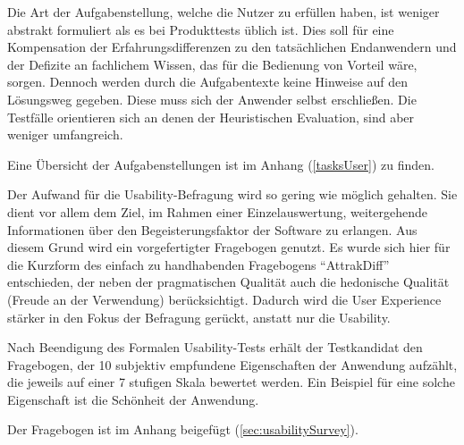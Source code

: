 Die Art der Aufgabenstellung, welche die Nutzer zu erfüllen haben, ist weniger abstrakt formuliert als es bei Produkttests üblich ist. Dies soll für eine Kompensation der Erfahrungsdifferenzen zu den tatsächlichen Endanwendern und der Defizite an fachlichem Wissen, das für die Bedienung von Vorteil wäre, sorgen. Dennoch werden durch die Aufgabentexte keine Hinweise auf den Lösungsweg gegeben. Diese muss sich der Anwender selbst erschließen. Die Testfälle orientieren sich an denen der Heuristischen Evaluation, sind aber weniger umfangreich.\par
Eine Übersicht der Aufgabenstellungen ist im Anhang (\ref{tasksUser}) zu finden.\par
{}
Der Aufwand für die Usability-Befragung wird so gering wie möglich gehalten. Sie dient vor allem dem Ziel, im Rahmen einer Einzelauswertung, weitergehende Informationen über den Begeisterungsfaktor der Software zu erlangen. Aus diesem Grund wird ein vorgefertigter Fragebogen genutzt. Es wurde sich hier für die Kurzform des einfach zu handhabenden Fragebogens \enquote{AttrakDiff} entschieden, der neben der pragmatischen Qualität auch die hedonische Qualität (Freude an der Verwendung) berücksichtigt. Dadurch wird die User Experience stärker in den Fokus der Befragung gerückt, anstatt nur die Usability.\cite[S. 237]{Ullenboom2014}\par
Nach Beendigung des Formalen Usability-Tests erhält der Testkandidat den Fragebogen, der 10 subjektiv empfundene Eigenschaften der Anwendung aufzählt, die jeweils auf einer 7 stufigen Skala bewertet werden. Ein Beispiel für eine solche Eigenschaft ist die Schönheit der Anwendung.\par
Der Fragebogen ist im Anhang beigefügt (\ref{sec:usabilitySurvey}).\par
